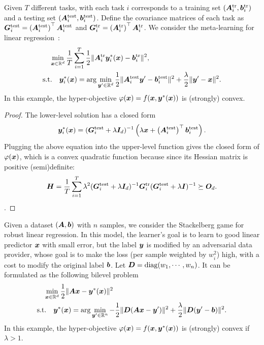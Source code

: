 \begin{exmp}
Given $T$ different tasks, with each task $i$ corresponds to a training set $({\bm{A}}_i^{\rm tr}, {\bm{b}}_i^{\rm tr})$ and  a testing set $({\bm{A}}_i^{\rm test}, {\bm{b}}_i^{\rm  test})$. Define the covariance matrices of each task as ${\bm{G}}_i^{\rm test}  =\left({\bm{A}}_i^{\rm test}  \right)^\top {\bm{A}}_i^{\rm test} $ and ${\bm{G}}_i^{\rm tr}  =\left({\bm{A}}_i^{\rm tr}  \right)^\top {\bm{A}}_i^{\rm tr}$. 
We consider the meta-learning for linear regression~\citep{rajeswaran2019meta}:
    \begin{align*}
        &\quad \min_{{\bm{x}} \in {\mathbb{R}}^d} \frac{1}{T} \sum_{i=1}^T \frac{1}{2} \Vert {\bm{A}}_i^{\rm tr} {\bm{y}}_i^*({\bm{x}}) - {\bm{b}}_i^{\rm tr} \Vert^2, \\
        &{\rm s.t.} \quad {\bm{y}}_i^*({\bm{x}}) = \arg \min_{{\bm{y}}' \in {\mathbb{R}}^d} \frac{1}{2} \Vert {\bm{A}}_i^{\rm test} {\bm{y}}' - {\bm{b}}_i^{\rm test} \Vert^2 + \frac{\lambda}{2} \Vert {\bm{y}}' - {\bm{x}} \Vert^2.
    \end{align*}
In this example, the hyper-objective $\varphi({\bm{x}}) = f({\bm{x}},{\bm{y}}^*({\bm{x}}))$ is (strongly) convex.
\end{exmp}

\begin{proof}
The lower-level solution has a closed form
\begin{align*}
    &\quad {\bm{y}}_i^*({\bm{x}}) = ({\bm{G}}_i^{\rm test} + \lambda {\bm{I}}_d)^{-1} \left(\lambda {\bm{x}} + \left({\bm{A}}_i^{\rm test} \right)^\top {\bm{b}}_i^{\rm test} \right).
\end{align*}
Plugging the above equation into the upper-level function gives the closed form of $\varphi({\bm{x}})$, which is a convex quadratic function because since its Hessian matrix is positive (semi)definite:
\begin{align*}
    &\quad {\bm{H}} = \frac{1}{T} \sum_{i=1}^T \lambda^2 ({\bm{G}}_i^{\rm test} + \lambda {\bm{I}}_d)^{-1} {\bm{G}}_i^{\rm tr} ({\bm{G}}_i^{\rm test} + \lambda {\bm{I}})^{-1} \succeq {\bm{O}}_d.
\end{align*}.
\end{proof}

\begin{exmp}
Given a dataset $({\bm{A}},{\bm{b}})$ with $n$ samples, we  
consider the Stackelberg game \citep{bruckner2011stackelberg} for robust linear regression. In this model, the learner's goal is to learn to good linear predictor ${\bm{x}}$ with small error, but the label ${\bm{y}}$ is modified by an adversarial data provider, whose goal is to make the loss (per sample weighted by $w_i^2$) high, with a cost to modify the original label ${\bm{b}}$. 
Let ${\bm{D}} = {\rm diag}(w_1,\cdots, w_n)$.
It can be formulated as the following bilevel problem
\begin{align*}
    &\quad \min_{{\bm{x}} \in {\mathbb{R}}^d} \frac{1}{2} \Vert {\bm{A}} {\bm{x}} - {\bm{y}}^*({\bm{x}}) \Vert^2 \\
    &{\rm s.t.} \quad {\bm{y}}^*({\bm{x}}) = \arg \min_{{\bm{y}}' \in {\mathbb{R}}^n} - \frac{1}{2} \Vert {\bm{D}} ({\bm{A}} {\bm{x}} - {\bm{y}}') \Vert^2 + \frac{\lambda}{2} \Vert {\bm{D}}({\bm{y}}'  -{\bm{b}}) \Vert^2.
\end{align*}
In this example, the hyper-objective $\varphi({\bm{x}}) = f({\bm{x}},{\bm{y}}^*({\bm{x}}))$ is (strongly) convex if $\lambda >1$.
\end{exmp}

